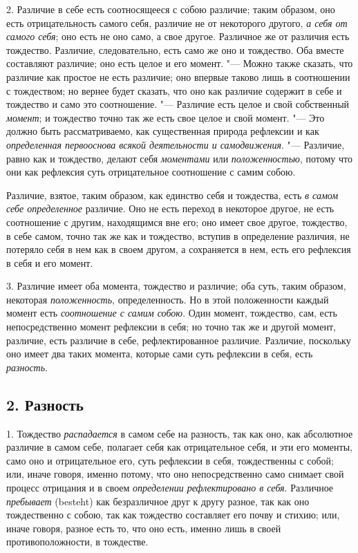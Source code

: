 2. Различие в себе есть соотносящееся с собою различие; таким образом, оно
есть отрицательность самого себя, различие не от некоторого другого,
{\em а себя от самого себя}; оно есть не оно само, а
свое другое. Различное же от различия есть тождество. Различие,
следовательно, есть само же оно и тождество. Оба вместе составляют
различие; оно есть целое и его момент. "--- Можно также сказать, что различие
как простое не есть различие; оно впервые таково лишь в соотношении с
тождеством; но вернее будет сказать, что оно как различие содержит в себе и
тождество и само это соотношение. "--- Различие есть целое и свой собственный
{\em момент}; и тождество точно так же есть свое целое
и свой момент. "--- Это должно быть рассматриваемо, как существенная природа
рефлексии и как {\em определенная первооснова всякой
деятельности и самодвижения}. "--- Различие, равно как и тождество, делают
себя {\em моментами} или
{\em положенностью}, потому что они как рефлексия суть
отрицательное соотношение с самим собою.

Различие, взятое, таким образом, как единство себя и тождества, есть
{\em в самом себе определенное} различие. Оно не есть
переход в некоторое другое, не есть соотношение с другим, находящимся вне
его; оно имеет свое другое, тождество, в себе самом, точно так же как и
тождество, вступив в определение различия, не потеряло себя в нем как в
своем другом, а сохраняется в нем, есть его рефлексия в себя и его момент.

3. Различие имеет оба момента, тождество и различие; оба суть, таким
образом, некоторая {\em положенность}, определенность.
Но в этой положенности каждый момент есть
{\em соотношение с самим собою}. Один момент,
тождество, сам, есть непосредственно момент рефлексии в себя; но точно так
же и другой момент, различие, есть различие в себе, рефлектированное
различие. Различие, поскольку оно имеет два таких момента, которые сами
суть рефлексии в себя, есть {\em разность}.

\subsection[2. Разность]{2. Разность}
1. Тождество {\em распадается} в самом себе на разность, так как
оно, как абсолютное различие в самом себе, полагает себя как отрицательное
себя, и эти его моменты, само оно и отрицательное его, суть рефлексии в
себя, тождественны с собой; или, иначе говоря, именно потому, что оно
непосредственно само снимает свой процесс отрицания и в своем
{\em определении рефлектировано в себя}. Различное
{\em пребывает} (besteht) как безразличное друг к другу
разное, так как оно тождественно с собою, так как тождество составляет его
почву и стихию; или, иначе говоря, разное есть то, что оно есть, именно
лишь в своей противоположности, в тождестве.

